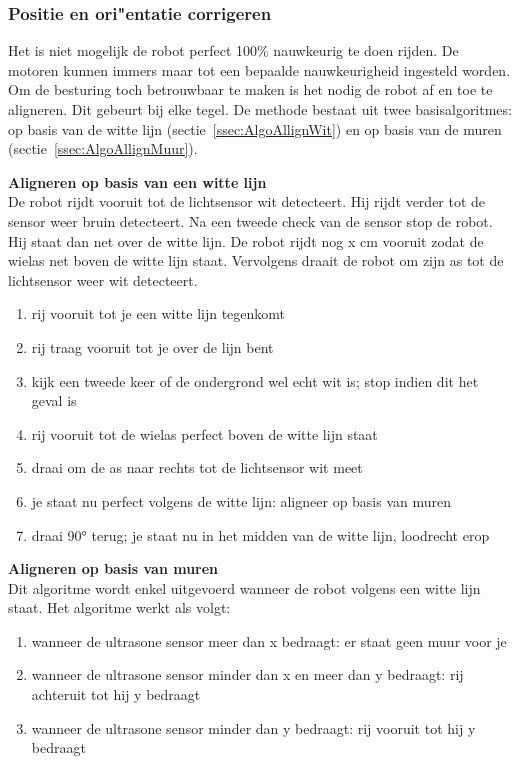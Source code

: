 \documentclass[tt3]{penoverslag}
\begin{document}
\subsubsection{Positie en ori"entatie corrigeren}
\label{ssec:AlgoAllign}
Het is niet mogelijk de robot perfect 100\% nauwkeurig te doen rijden. De motoren kunnen immers maar tot een bepaalde nauwkeurigheid ingesteld worden. Om de besturing toch betrouwbaar te maken is het nodig de robot af en toe te aligneren. Dit gebeurt bij elke tegel. %
De methode bestaat uit twee basisalgoritmes: op basis van de witte lijn (sectie~\ref{ssec:AlgoAllignWit}) en op basis van de muren (sectie~\ref{ssec:AlgoAllignMuur}).

\begin{description}


\item \textbf{Aligneren op basis van een witte lijn}\\
\label{ssec:AlgoAllignWit}
De robot rijdt vooruit tot de lichtsensor wit detecteert. Hij rijdt verder tot de sensor weer bruin detecteert. Na een tweede check van de sensor stop de robot. Hij staat dan net over de witte lijn. De robot rijdt nog x cm vooruit zodat de wielas net boven de witte lijn staat.
Vervolgens draait de robot om zijn as tot de lichtsensor weer wit detecteert.

\begin{enumerate}
	\item rij vooruit tot je een witte lijn tegenkomt
	\item rij traag vooruit tot je over de lijn bent
	\item kijk een tweede keer of de ondergrond wel echt wit is; stop indien dit het geval is
	\item rij vooruit tot de wielas perfect boven de witte lijn staat
	\item draai om de as naar rechts tot de lichtsensor wit meet
	\item je staat nu perfect volgens de witte lijn: aligneer op basis van muren
	\item draai 90° terug; je staat nu in het midden van de witte lijn, loodrecht erop
\end{enumerate}

\item \textbf{Aligneren op basis van muren}\\
\label{ssec:AlgoAllignMuur}
Dit algoritme wordt enkel uitgevoerd wanneer de robot volgens een witte lijn staat. Het algoritme werkt als volgt:

\begin{enumerate}
	\item wanneer de ultrasone sensor meer dan x bedraagt: er staat geen muur voor je %
	\item wanneer de ultrasone sensor minder dan x en meer dan y bedraagt: rij achteruit tot hij y bedraagt %
	\item wanneer de ultrasone sensor minder dan y bedraagt: rij vooruit tot hij y bedraagt
\end{enumerate}

\end{description}
\end{document}
